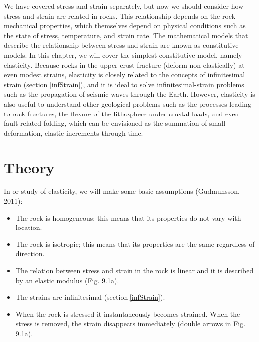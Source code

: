\documentclass[a4paper , 12pt]{book}
\begin{document}
We have covered stress and strain separately, but now we should consider how stress and strain are related in rocks. This relationship depends on the rock mechanical properties, which themselves depend on physical conditions such as the state of stress, temperature, and strain rate. The mathematical models that describe the relationship between stress and strain are known as constitutive models. In this chapter, we will cover the simplest constitutive model, namely elasticity. Because rocks in the upper crust fracture (deform non-elastically) at even modest strains, elasticity is closely related to the concepts of infinitesimal strain (section \ref{infStrain}), and it is ideal to solve infinitesimal-strain problems such as the propagation of seismic waves through the Earth. However, elasticity is also useful to understand other geological problems such as the processes leading to rock fractures, the flexure of the lithosphere under crustal loads, and even fault related folding, which can be envisioned as the summation of small deformation, elastic increments through time.

\section{Theory}

In or study of elasticity, we will make some basic assumptions (Gudmunsson, 2011):

\begin{itemize}
    \item The rock is homogeneous; this means that its properties do not vary with location.
    \item The rock is isotropic; this means that its properties are the same regardless of direction.
    \item The relation between stress and strain in the rock is linear and it is described by an elastic modulus (Fig. 9.1a).
    \item The strains are infinitesimal (section \ref{infStrain}).
    \item When the rock is stressed it instantaneously becomes strained. When the stress is removed, the strain disappears immediately (double arrows in Fig. 9.1a).
\end{itemize}
\end{document}

